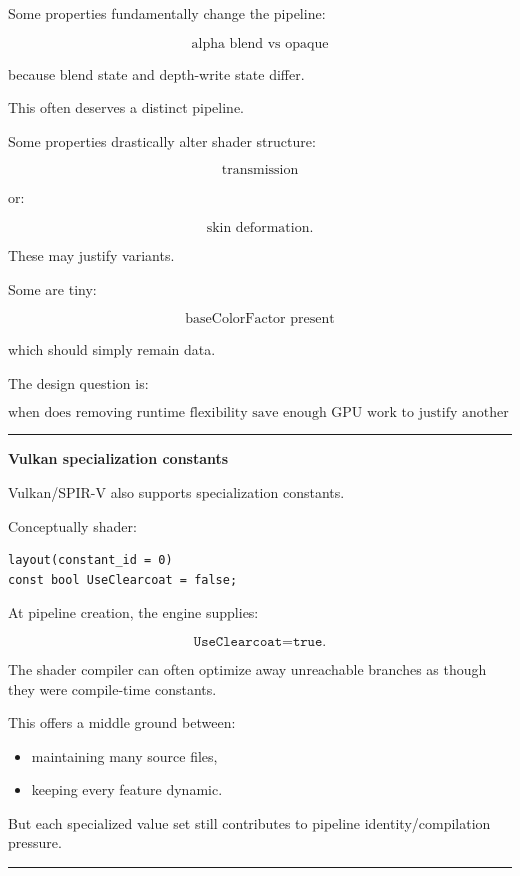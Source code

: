 Some properties fundamentally change the pipeline:

\[
\text{alpha blend vs opaque}
\]

because blend state and depth-write state differ.

This often deserves a distinct pipeline.

Some properties drastically alter shader structure:

\[
\text{transmission}
\]

or:

\[
\text{skin deformation}.
\]

These may justify variants.

Some are tiny:

\[
\text{baseColorFactor present}
\]

which should simply remain data.

The design question is:

\[
\boxed{
\text{when does removing runtime flexibility save enough GPU work to justify another compiled variant?}
}
\]

\begin{center}\rule{0.5\linewidth}{0.5pt}\end{center}

\textbf{Vulkan specialization constants}

Vulkan/SPIR-V also supports specialization constants.

Conceptually shader:

\begin{verbatim}
layout(constant_id = 0)
const bool UseClearcoat = false;
\end{verbatim}

At pipeline creation, the engine supplies:

\[
\texttt{UseClearcoat=true}.
\]

The shader compiler can often optimize away unreachable branches as though they were compile-time constants.

This offers a middle ground between:

\begin{itemize}
\tightlist
\item
  maintaining many source files,
\item
  keeping every feature dynamic.
\end{itemize}

But each specialized value set still contributes to pipeline identity/compilation pressure.

\begin{center}\rule{0.5\linewidth}{0.5pt}\end{center}

